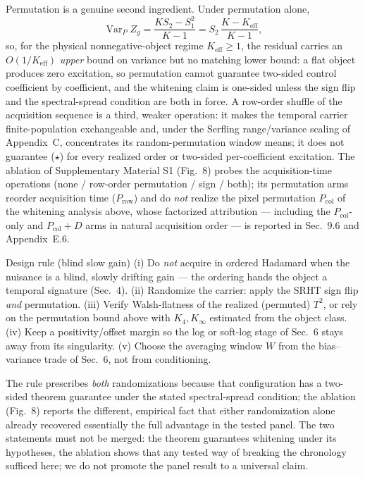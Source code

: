 Permutation is a genuine second ingredient. Under permutation alone,
\[\operatorname{Var}_P Z_g = \frac{K S_2 - S_1^2}{K-1} = S_2\,\frac{K - K_{\mathrm{eff}}}{K-1},\]
so, for the physical nonnegative-object regime $K_{\mathrm{eff}}\ge1$, the residual carries an $O(1/K_{\mathrm{eff}})$ \emph{upper} bound on variance but no matching lower bound: a flat object produces zero excitation, so permutation cannot guarantee two-sided control coefficient by coefficient, and the whitening claim is one-sided unless the sign flip and the spectral-spread condition are both in force. A row-order shuffle of the acquisition sequence is a third, weaker operation: it makes the temporal carrier finite-population exchangeable and, under the Serfling range/variance scaling of Appendix~C, concentrates its random-permutation window means; it does not guarantee ($\star$) for every realized order or two-sided per-coefficient excitation. The ablation of Supplementary Material S1 (Fig.~8) probes the acquisition-time operations (none / row-order permutation / sign / both); its permutation arms reorder acquisition time ($P_{\mathrm{row}}$) and do \emph{not} realize the pixel permutation $P_{\mathrm{col}}$ of the whitening analysis above, whose factorized attribution --- including the $P_{\mathrm{col}}$-only and $P_{\mathrm{col}}{+}D$ arms in natural acquisition order --- is reported in Sec.~9.6 and Appendix~E.6.

\begin{nameddef}{Design rule (blind slow gain)}
(i) Do \emph{not} acquire in ordered Hadamard when the nuisance is a blind, slowly drifting gain --- the ordering hands the object a temporal signature (Sec.~4). (ii) Randomize the carrier: apply the SRHT sign flip \emph{and} permutation. (iii) Verify Walsh-flatness of the realized (permuted) $T^2$, or rely on the permutation bound above with $K_4, K_\infty$ estimated from the object class. (iv) Keep a positivity/offset margin so the log or soft-log stage of Sec.~6 stays away from its singularity. (v) Choose the averaging window $W$ from the bias--variance trade of Sec.~6, not from conditioning.
\end{nameddef}

The rule prescribes \emph{both} randomizations because that configuration has a two-sided theorem guarantee under the stated spectral-spread condition; the ablation (Fig.~8) reports the different, empirical fact that either randomization alone already recovered essentially the full advantage in the tested panel. The two statements must not be merged: the theorem guarantees whitening under its hypotheses, the ablation shows that any tested way of breaking the chronology sufficed here; we do not promote the panel result to a universal claim.

